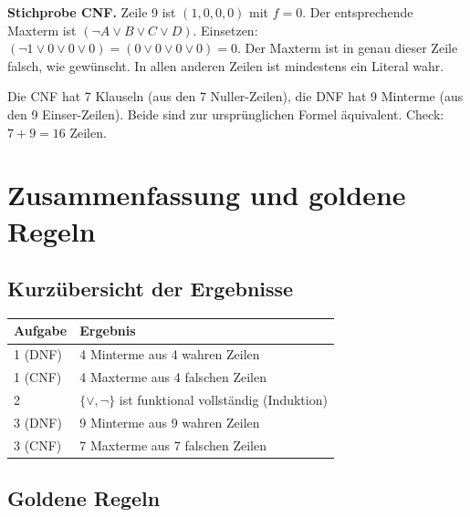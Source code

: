 \documentclass[a4paper,12pt]{article}
\begin{document}
\textbf{Stichprobe CNF.} Zeile 9 ist $(1,0,0,0)$ mit $f = 0$. Der
entsprechende Maxterm ist $(\neg A \vee B \vee C \vee D)$. Einsetzen:
$(\neg 1 \vee 0 \vee 0 \vee 0) = (0 \vee 0 \vee 0 \vee 0) = 0$. Der
Maxterm ist in genau dieser Zeile falsch, wie gew\"unscht. In allen
anderen Zeilen ist mindestens ein Literal wahr.

\begin{merkbox}[title={Ergebnis Aufgabe~3}]
Die CNF hat 7 Klauseln (aus den 7 Nuller-Zeilen), die DNF hat
9 Minterme (aus den 9 Einser-Zeilen). Beide sind zur urspr\"unglichen
Formel \"aquivalent. Check: $7 + 9 = 16$ Zeilen.
\end{merkbox}

\newpage


\section*{Zusammenfassung und goldene Regeln}

\subsection*{Kurz\"ubersicht der Ergebnisse}

\begin{center}
\renewcommand{\arraystretch}{1.3}
\begin{tabular}{l|l}
\toprule
\textbf{Aufgabe} & \textbf{Ergebnis} \\
\midrule
1 (DNF) & 4 Minterme aus 4 wahren Zeilen \\
1 (CNF) & 4 Maxterme aus 4 falschen Zeilen \\
2 & $\{\vee, \neg\}$ ist funktional vollst\"andig (Induktion) \\
3 (DNF) & 9 Minterme aus 9 wahren Zeilen \\
3 (CNF) & 7 Maxterme aus 7 falschen Zeilen \\
\bottomrule
\end{tabular}
\end{center}

\subsection*{Goldene Regeln}
\end{document}
